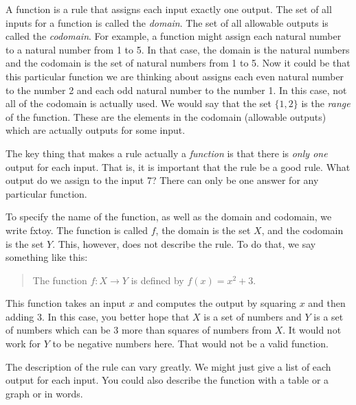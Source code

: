 \documentclass[12pt]{article}
\begin{document}
A function is a rule that assigns each input exactly one output.  The set of all inputs for a function is called the \emph{domain}.  The set of all allowable outputs is called the \emph{codomain}.  For example, a function might assign each natural number to a natural number from 1 to 5.  In that case, the domain is the natural numbers and the codomain is the set of natural numbers from 1 to 5. Now it could be that this particular function we are thinking about assigns each even natural number to the number 2 and each odd natural number to the number 1.  In this case, not all of the codomain is actually used.  We would say that the set $\{1,2\}$ is the \emph{range} of the function. These are the elements in the codomain (allowable outputs) which are actually outputs for some input.

The key thing that makes a rule actually a \emph{function} is that there is \emph{only one} output for each input.  That is, it is important that the rule be a good rule.  What output do we assign to the input 7?  There can only be one answer for any particular function.

To specify the name of the function, as well as the domain and codomain, we write \gls{fxtoy}.  The function is called $f$, the domain is the set $X$, and the codomain is the set $Y$.  This, however, does not describe the rule.  To do that, we say something like this:

\begin{quote}
  The function $f:X \to Y$ is defined by $f(x) = x^2 + 3$.
\end{quote}

This function takes an input $x$ and computes the output by squaring $x$ and then adding 3.  In this case, you better hope that $X$ is a set of numbers and $Y$ is a set of numbers which can be 3 more than squares of numbers from $X$.  It would not work for $Y$ to be negative numbers here. That would not be a valid function.

The description of the rule can vary greatly.  We might just give a list of each output for each input.  You could also describe the function with a table or a graph or in words.
\end{document}
